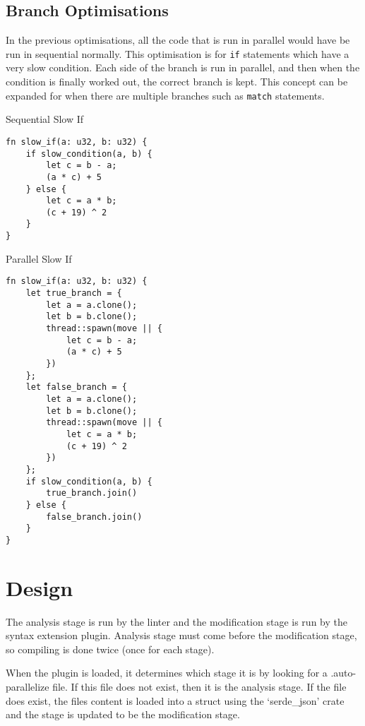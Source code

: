 \documentclass[conference]{IEEEtran}
\begin{document}
\subsection{Branch Optimisations}
In the previous optimisations, all the code that is run in parallel would have be run in sequential normally. This optimisation is for \texttt{if} statements which have a very slow condition. Each side of the branch is run in parallel, and then when the condition is finally worked out, the correct branch is kept. This concept can be expanded for when there are multiple branches such as \texttt{match} statements.


\begin{algorithm}
\caption{Sequential Slow If}
\label{code:seq-slowif}
\begin{verbatim}
fn slow_if(a: u32, b: u32) {
    if slow_condition(a, b) {
        let c = b - a;
        (a * c) + 5
    } else {
        let c = a * b;
        (c + 19) ^ 2
    }
}
\end{verbatim}
\end{algorithm}

\begin{algorithm}
\caption{Parallel Slow If}
\label{code:par-slowif}
\begin{verbatim}
fn slow_if(a: u32, b: u32) {
    let true_branch = {
        let a = a.clone();
        let b = b.clone();
        thread::spawn(move || {
            let c = b - a;
            (a * c) + 5
        })
    };
    let false_branch = {
        let a = a.clone();
        let b = b.clone();
        thread::spawn(move || {
            let c = a * b;
            (c + 19) ^ 2
        })
    };
    if slow_condition(a, b) {
        true_branch.join()
    } else {
        false_branch.join()
    }
}

\end{verbatim}
\end{algorithm}

\section{Design}

The analysis stage is run by the linter and the modification stage is run by the syntax extension plugin. Analysis stage must come before the modification stage, so compiling is done twice (once for each stage).

When the plugin is loaded, it determines which stage it is by looking for a .auto-parallelize file. If this file does not exist, then it is the analysis stage. If the file does exist, the files content is loaded into a struct using the `serde\_json' crate and the stage is updated to be the modification stage.
\end{document}
